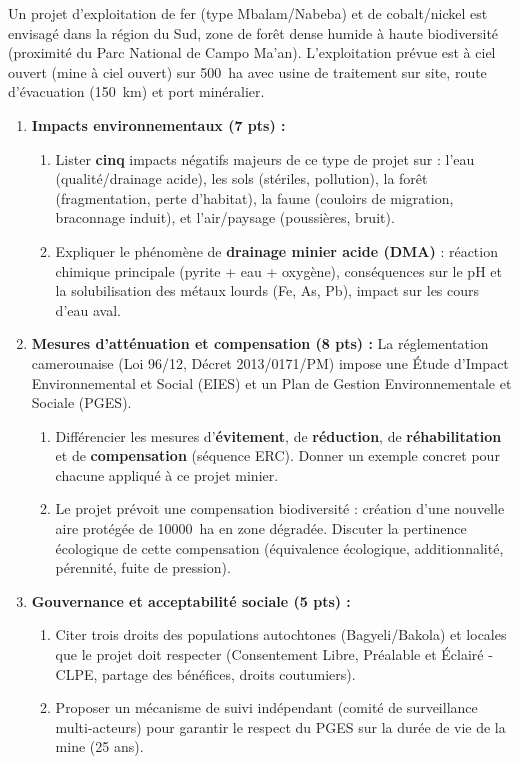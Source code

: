 \documentclass[11pt]{article}
\begin{document}
\begin{exercice}
Un projet d'exploitation de fer (type Mbalam/Nabeba) et de cobalt/nickel est envisagé dans la région du Sud, zone de forêt dense humide à haute biodiversité (proximité du Parc National de Campo Ma'an). L'exploitation prévue est à ciel ouvert (mine à ciel ouvert) sur \SI{500}{ha} avec usine de traitement sur site, route d'évacuation (\SI{150}{km}) et port minéralier.
\begin{enumerate}
\item \textbf{Impacts environnementaux (7 pts) :}
\begin{enumerate}
\item Lister \textbf{cinq} impacts négatifs majeurs de ce type de projet sur : l'eau (qualité/drainage acide), les sols (stériles, pollution), la forêt (fragmentation, perte d'habitat), la faune (couloirs de migration, braconnage induit), et l'air/paysage (poussières, bruit).
\item Expliquer le phénomène de \textbf{drainage minier acide (DMA)} : réaction chimique principale (pyrite + eau + oxygène), conséquences sur le pH et la solubilisation des métaux lourds (Fe, As, Pb), impact sur les cours d'eau aval.
\end{enumerate}
\item \textbf{Mesures d'atténuation et compensation (8 pts) :}
La réglementation camerounaise (Loi 96/12, Décret 2013/0171/PM) impose une Étude d'Impact Environnemental et Social (EIES) et un Plan de Gestion Environnementale et Sociale (PGES).
\begin{enumerate}
\item Différencier les mesures d'\textbf{évitement}, de \textbf{réduction}, de \textbf{réhabilitation} et de \textbf{compensation} (séquence ERC). Donner un exemple concret pour chacune appliqué à ce projet minier.
\item Le projet prévoit une compensation biodiversité : création d'une nouvelle aire protégée de \SI{10 000}{ha} en zone dégradée. Discuter la pertinence écologique de cette compensation (équivalence écologique, additionnalité, pérennité, fuite de pression).
\end{enumerate}
\item \textbf{Gouvernance et acceptabilité sociale (5 pts) :}
\begin{enumerate}
\item Citer trois droits des populations autochtones (Bagyeli/Bakola) et locales que le projet doit respecter (Consentement Libre, Préalable et Éclairé - CLPE, partage des bénéfices, droits coutumiers).
\item Proposer un mécanisme de suivi indépendant (comité de surveillance multi-acteurs) pour garantir le respect du PGES sur la durée de vie de la mine (25 ans).
\end{enumerate}
\end{enumerate}
\end{exercice}
\end{document}

